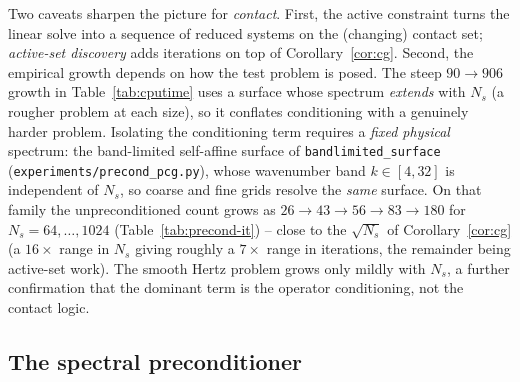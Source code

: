 \documentclass[11pt,a4paper]{article}
\newcommand{\code}[1]{\texttt{#1}}
\theoremstyle{definition}
\theoremstyle{remark}
\begin{document}
Two caveats sharpen the picture for \emph{contact}. First, the active constraint
turns the linear solve into a sequence of reduced systems on the (changing)
contact set; \emph{active-set discovery} adds iterations on top of
Corollary~\ref{cor:cg}. Second, the empirical growth depends on how the test
problem is posed. The steep $90\!\to\!906$ growth in Table~\ref{tab:cputime} uses
a surface whose spectrum \emph{extends} with $N_s$ (a rougher problem at each
size), so it conflates conditioning with a genuinely harder problem. Isolating the
conditioning term requires a \emph{fixed physical} spectrum: the band-limited
self-affine surface of \code{bandlimited\_surface} (\code{experiments/precond\_pcg.py}),
whose wavenumber band $k\in[4,32]$ is independent of $N_s$, so coarse and fine
grids resolve the \emph{same} surface. On that family the unpreconditioned count
grows as $26\!\to\!43\!\to\!56\!\to\!83\!\to\!180$ for $N_s=64,\dots,1024$
(Table~\ref{tab:precond-it}) -- close to the $\sqrt{N_s}$ of
Corollary~\ref{cor:cg} (a $16\times$ range in $N_s$ giving roughly a $7\times$
range in iterations, the remainder being active-set work). The smooth Hertz
problem grows only mildly with $N_s$, a further confirmation that the dominant
term is the operator conditioning, not the contact logic.

\subsection{The spectral preconditioner}
\label{sec:precond}
\end{document}
